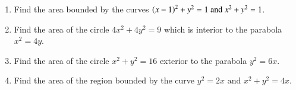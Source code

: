 \begin{enumerate}[label=\thesubsection.\arabic*,ref=\thesubsection.\theenumi]
%
\item Find the area bounded by the curves $\left(x-1\right)^2 + y^2 = 1 \text{ and } x^2+y^2=1$.
\label{chapters/12/8/2/2}
\\
\solution

\item 
	Find the area of the circle $4x^2+4y^2=9$ which is interior to the parabola $x^2=4y$.
\label{chapters/12/8/2/1}
\item 
	Find the area of the circle $x^2 + y^2 = 16$ exterior to the parabola $y^2 = 6x$.
\label{chapters/12/8/3/18}
\item Find the area of the region bounded by the curve $y^2 = 2x\text{ and }x^2 + y^2 = 4x$.
\end{enumerate}
